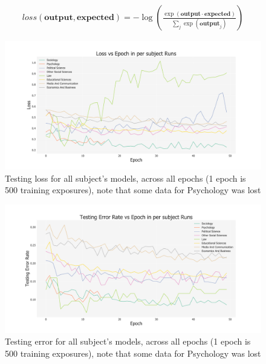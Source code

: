 \documentclass[12pt, a4paper]{article}
\begin{document}
\begin{align}\label{cross_en}
	loss(\boldsymbol{output}, \boldsymbol{expected}) = - \log \left(\frac{\exp(\boldsymbol{output} \cdot \boldsymbol{expected})}{\sum_j \exp (\boldsymbol{output}_j)}\right)
\end{align}

\begin{figure}[ht]
	\centering
	\begin{adjustbox}{center}
		\includegraphics[width=1.3\textwidth]{loss_mixed}
	\end{adjustbox}
	\caption{Testing loss for all subject's models, across all epochs (1 epoch is 500 training exposures), note that some data for Psychology was lost}\label{loss}
\end{figure}

\begin{figure}[ht]
	\centering
	\begin{adjustbox}{center}
		\includegraphics[width=1.3\textwidth]{err_mixed}
	\end{adjustbox}
	\caption{Testing error for all subject's models, across all epochs (1 epoch is 500 training exposures), note that some data for Psychology was lost}\label{err}
\end{figure}
\end{document}
